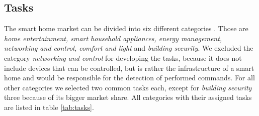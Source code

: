 \documentclass[sigchi]{acmart}
\begin{document}
	\subsection{Tasks}
	The smart home market can be divided into six different categories \cite{.c}. Those are \textit{home entertainment, smart household appliances, energy management, networking and control, comfort and light} and \textit{building security}. We excluded the category \textit{networking and control} for developing the tasks, because it does not include devices that can be controlled, but is rather the infrastructure of a smart home and would be responsible for the detection of performed commands. For all other categories we selected two common tasks \cite{.d} each, except for \textit{building security} three because of its bigger market share. All categories with their assigned tasks are listed in table \ref{tab:tasks}.
\end{document}
